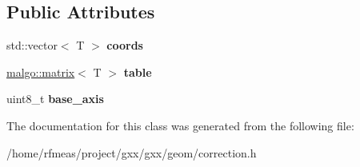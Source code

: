\subsection*{Public Attributes}
\begin{DoxyCompactItemize}
\item 
std\+::vector$<$ T $>$ {\bfseries coords}\hypertarget{classgxx_1_1ngeom_1_1single__axis__correction__table_a826f8269142995ab776c0e65f6d84a85}{}\label{classgxx_1_1ngeom_1_1single__axis__correction__table_a826f8269142995ab776c0e65f6d84a85}

\item 
\hyperlink{classmalgo_1_1matrix}{malgo\+::matrix}$<$ T $>$ {\bfseries table}\hypertarget{classgxx_1_1ngeom_1_1single__axis__correction__table_aee820c3586f93870727216813176670c}{}\label{classgxx_1_1ngeom_1_1single__axis__correction__table_aee820c3586f93870727216813176670c}

\item 
uint8\+\_\+t {\bfseries base\+\_\+axis}\hypertarget{classgxx_1_1ngeom_1_1single__axis__correction__table_a6392bc5575e517874ea1fe23b9cb004e}{}\label{classgxx_1_1ngeom_1_1single__axis__correction__table_a6392bc5575e517874ea1fe23b9cb004e}

\end{DoxyCompactItemize}


The documentation for this class was generated from the following file\+:\begin{DoxyCompactItemize}
\item 
/home/rfmeas/project/gxx/gxx/geom/correction.\+h\end{DoxyCompactItemize}
